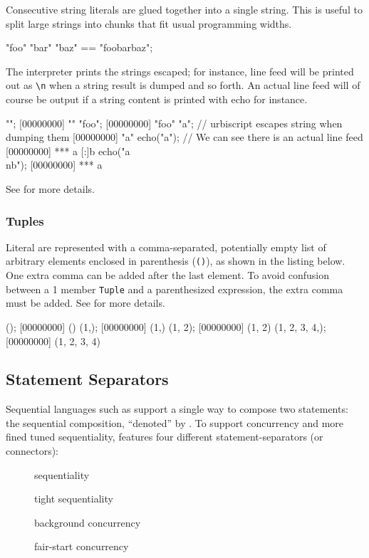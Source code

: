 Consecutive string literals are glued together into a single string.
This is useful to split large strings into chunks that fit usual
programming widths.

\begin{urbiassert}
"foo" "bar" "baz" == "foobarbaz";
\end{urbiassert}

The interpreter prints the strings escaped; for instance, line feed
will be printed out as \lstinline|\n| when a string result is dumped
and so forth. An actual line feed will of course be output if a string
content is printed with echo for instance.

\begin{urbiscript}
"";
[00000000] ""
"foo";
[00000000] "foo"
"a\nb"; // urbiscript escapes string when dumping them
[00000000] "a\nb"
echo("a\nb"); // We can see there is an actual line feed
[00000000] *** a
[:]b
echo("a\\nb");
[00000000] *** a\nb
\end{urbiscript}

See  for more details.

\subsubsection{Tuples}
\label{sec:us-syn-lit-tuples}

Literal  are represented with a comma-separated, potentially
empty list of arbitrary elements enclosed in parenthesis (\lstinline|()|),
as shown in the listing below.  One extra comma can be added after the last
element.  To avoid confusion between a 1 member \lstinline|Tuple| and a
parenthesized expression, the extra comma must be added.  See
 for more details.

\begin{urbiscript}
();
[00000000] ()
(1,);
[00000000] (1,)
(1, 2);
[00000000] (1, 2)
(1, 2, 3, 4,);
[00000000] (1, 2, 3, 4)
\end{urbiscript}



\subsection{Statement Separators}
\label{sec:lang:separators}

Sequential languages such as \Cxx support a single way to compose two
statements: the sequential composition, ``denoted'' by \samp{;}.  To
support concurrency and more fined tuned sequentiality, \us features
four different statement-separators (or connectors):
\begin{description}
\item[\samp{;}] sequentiality
\item[\samp{|}] tight sequentiality
\item[\samp{,}] background concurrency
\item[\samp{\&}] fair-start concurrency
\end{description}

